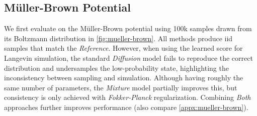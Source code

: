 \subsection{Müller-Brown Potential}
We first evaluate on the Müller-Brown potential using 100k samples drawn from its Boltzmann distribution in \cref{fig:mueller-brown}. All methods produce iid samples that match the \emph{Reference}. However, when using the learned score for Langevin simulation, the standard \emph{Diffusion} model fails to reproduce the correct distribution and undersamples the low-probability state, highlighting the inconsistency between sampling and simulation. Although having roughly the same number of parameters, the \emph{Mixture} model partially improves this, but consistency is only achieved with \emph{Fokker-Planck} regularization. Combining \emph{Both} approaches further improves performance (also compare \cref{appx:mueller-brown}).


